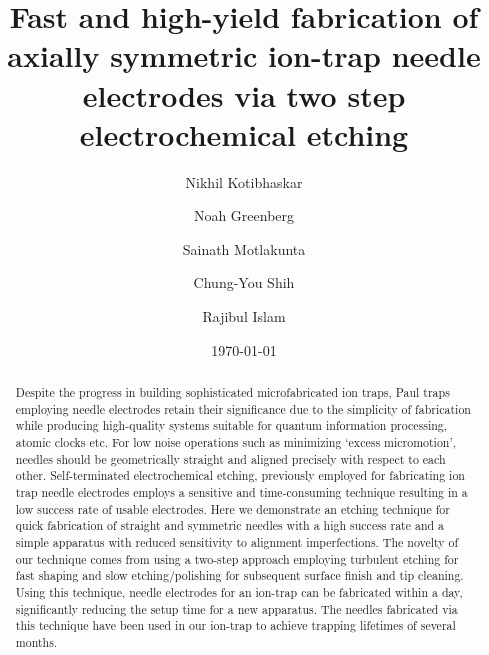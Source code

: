 \documentclass[%
 aip,
 amsmath,amssymb,
 reprint,%
]{revtex4-1}
\begin{document}

\title[Fast and high-yield fabrication of axially symmetric ion-trap needle electrodes via two step electrochemical etching]{Fast and high-yield fabrication of axially symmetric ion-trap needle electrodes via two step electrochemical etching}

\author{Nikhil Kotibhaskar}
\author{Noah Greenberg}%
\author{Sainath Motlakunta}
\author{Chung-You Shih}
\author{Rajibul Islam}
%
\date{\today}%
\begin{abstract}
Despite the progress in building sophisticated microfabricated ion traps, Paul traps employing needle electrodes retain their significance due to the simplicity of fabrication while producing high-quality systems suitable for quantum information processing, atomic clocks etc.
For low noise operations such as minimizing `excess micromotion', needles should be geometrically straight and aligned precisely with respect to each other.
Self-terminated electrochemical etching, previously employed for fabricating ion trap needle electrodes employs a sensitive and time-consuming technique resulting in a low success rate of usable electrodes. 
Here we demonstrate an etching technique for quick fabrication of straight and symmetric needles with a high success rate and a simple apparatus with reduced sensitivity to alignment imperfections.
The novelty of our technique comes from using a two-step approach employing turbulent etching for fast shaping and slow etching/polishing for subsequent surface finish and tip cleaning.
Using this technique, needle electrodes for an ion-trap can be fabricated within a day, significantly reducing the setup time for a new apparatus.
The needles fabricated via this technique have been used in our ion-trap to achieve trapping lifetimes of several months. 


\end{abstract}

\maketitle
\end{document}
